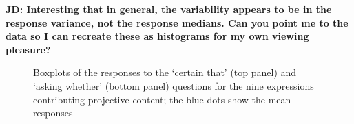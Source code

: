 \documentclass[11pt,fleqn]{article}
\newcommand{\6}{\mbox{$[\hspace*{-.6mm}[$}}
\newcommand{\9}{\mbox{$]\hspace*{-.6mm}]$}}
\begin{document}
{\bf JD: Interesting that in general, the variability appears to be in the response variance, not the response medians. Can you point me to the data so I can recreate these as histograms for my own viewing pleasure?}

\begin{figure}[!h]

\begin{center}

\end{center}

\caption{Boxplots of the responses to the `certain that' (top panel) and `asking whether' (bottom panel) questions for the nine expressions contributing projective content; the blue dots show the mean responses}\label{f-exp1a}
\end{figure}
\end{document}
